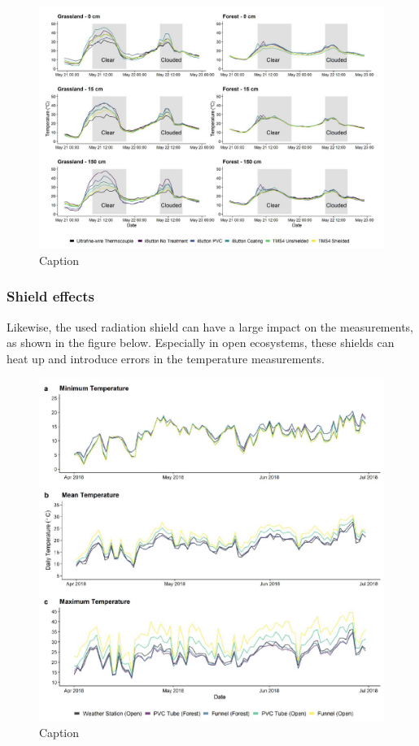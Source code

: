\documentclass[12pt,oneside]{book}
\begin{document}
\begin{figure}

{\centering \includegraphics[width=1\linewidth]{figures/Figure109} 

}

\caption{Caption}\label{fig:Micro9}
\end{figure}

\subsubsection{Shield effects}\label{shield-effects}

Likewise, the used radiation shield can have a large impact on the
measurements, as shown in the figure below. Especially in open
ecosystems, these shields can heat up and introduce errors in the
temperature measurements.

\begin{figure}

{\centering \includegraphics[width=1\linewidth]{figures/Figure1010} 

}

\caption{Caption}\label{fig:Micro10}
\end{figure}
\end{document}
